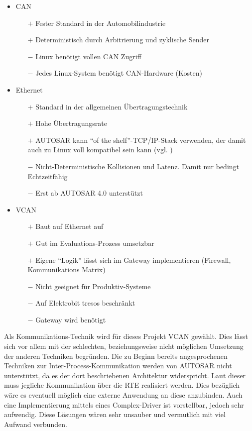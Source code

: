 \documentclass[
  a4paper,					    %
  twoside,
  DIV=calc,     				%
  bibliography=totoc,
  cleardoublepage=empty,
  ngerman,     					%
  final       					%
]{scrbook}
\begin{document}
\begin{itemize}
    \item CAN
    \begin{itemize}
        \item[$+$] Fester Standard in der Automobilindustrie
        \item[$+$] Deterministisch durch Arbitrierung und zyklische Sender
        \item[$-$] Linux benötigt vollen CAN Zugriff
        \item[$-$] Jedes Linux-System benötigt CAN-Hardware (Kosten)
    \end{itemize}
    \item Ethernet
    \begin{itemize}
        \item[$+$] Standard in der allgemeinen Übertragungstechnik
        \item[$+$] Hohe Übertragungsrate
        \item[$+$] AUTOSAR kann "`of the shelf"'-TCP/IP-Stack verwenden, der damit auch zu Linux voll kompatibel sein kann (vgl. \cite[S. 21]{autosar_eth})
        \item[$-$] Nicht-Deterministische Kollisionen und Latenz. Damit nur bedingt Echtzeitfähig
        \item[$-$] Erst ab AUTOSAR 4.0 unterstützt
    \end{itemize}
    \item VCAN
    \begin{itemize}
        \item[$+$] Baut auf Ethernet auf
        \item[$+$] Gut im Evaluations-Prozess umsetzbar
        \item[$+$] Eigene "`Logik"' lässt sich im Gateway implementieren (Firewall, Kommunikations Matrix)
        \item[$-$] Nicht geeignet für Produktiv-Systeme
        \item[$-$] Auf Elektrobit tresos beschränkt
        \item[$-$] Gateway wird benötigt
    \end{itemize}
\end{itemize}

Als Kommunikations-Technik wird für dieses Projekt VCAN gewählt. Dies lässt sich vor allem mit der schlechten, beziehungsweise nicht möglichen Umsetzung der anderen Techniken begründen. Die zu Beginn bereits angesprochenen Techniken zur Inter-Process-Kommunikation werden von AUTOSAR nicht unterstützt, da es der dort beschriebenen Architektur widerspricht. Laut dieser muss jegliche Kommunikation über die RTE realisiert werden. Dies bezüglich wäre es eventuell möglich eine externe Anwendung an diese anzubinden. Auch eine Implementierung mittels eines Complex-Driver ist vorstellbar, jedoch sehr aufwendig. Diese Lösungen wären sehr unsauber und vermutlich mit viel Aufwand verbunden.
\end{document}
